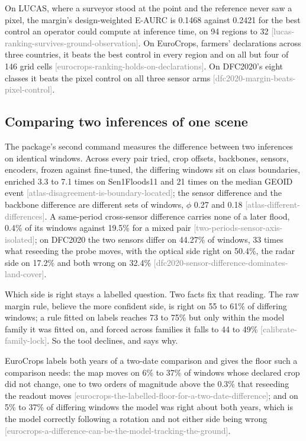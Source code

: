 \documentclass[11pt,a4paper]{article}
\newcommand{\claim}[1]{{\scriptsize\textsf{\textcolor{gray}{[#1]}}}}
\begin{document}
On LUCAS, where a surveyor stood at the point and the reference never saw a
pixel, the margin's design-weighted E-AURC is 0.1468 against 0.2421 for the best
control an operator could compute at inference time, on 94 regions to 32
\claim{lucas-ranking-survives-ground-observation}. On EuroCrops, farmers'
declarations across three countries, it beats the best control in every region
and on all but four of 146 grid cells \claim{eurocrops-ranking-holds-on-declarations}.
On DFC2020's eight classes it beats the pixel control on all three sensor arms
\claim{dfc2020-margin-beats-pixel-control}.

\subsection{Comparing two inferences of one scene}

The package's second command measures the difference between two inferences on
identical windows. Across every pair tried, crop offsets, backbones, sensors,
encoders, frozen against fine-tuned, the differing windows sit on class
boundaries, enriched 3.3 to 7.1 times on Sen1Floods11 and 21 times on the median
GEOID event \claim{atlas-disagreement-is-boundary-located}; the sensor difference
and the backbone difference are different sets of windows, $\phi$ 0.27 and 0.18
\claim{atlas-different-differences}. A same-period cross-sensor difference carries
none of a later flood, 0.4\% of its windows against 19.5\% for a mixed pair
\claim{two-periods-sensor-axis-isolated}; on DFC2020 the two sensors differ on
44.27\% of windows, 33 times what reseeding the probe moves, with the optical
side right on 50.4\%, the radar side on 17.2\% and both wrong on 32.4\%
\claim{dfc2020-sensor-difference-dominates-land-cover}.

Which side is right stays a labelled question. Two facts fix that reading. The
raw margin rule, believe the more confident side, is right on 55 to 61\% of
differing windows; a rule fitted on labels reaches 73 to 75\% but only within the
model family it was fitted on, and forced across families it falls to 44 to 49\%
\claim{calibrate-family-lock}. So the tool declines, and says why.

EuroCrops labels both years of a two-date comparison and gives the floor such a
comparison needs: the map moves on 6\% to 37\% of windows whose declared crop did
not change, one to two orders of magnitude above the 0.3\% that reseeding the
readout moves \claim{eurocrops-the-labelled-floor-for-a-two-date-difference}; and
on 5\% to 37\% of differing windows the model was right about both years, which is
the model correctly following a rotation and not either side being wrong
\claim{eurocrops-a-difference-can-be-the-model-tracking-the-ground}.
\end{document}

